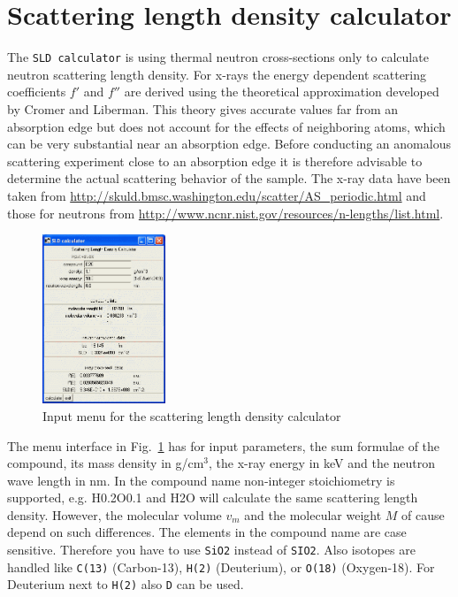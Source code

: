 \clearpage
\section{Scattering length density calculator}
\label{sec:SLDcalculator}

The \texttt{SLD calculator} is using thermal neutron cross-sections
only to calculate neutron scattering length density. For x-rays the
energy dependent scattering coefficients $f'$ and $f''$ are derived
using the theoretical approximation developed by Cromer and
Liberman. This theory gives accurate values far from an absorption
edge but does not account for the effects of neighboring atoms,
which can be very substantial near an absorption edge. Before
conducting an anomalous scattering experiment close to an absorption
edge it is therefore advisable to determine the actual scattering
behavior of the sample. The x-ray data have been taken from
\url{http://skuld.bmsc.washington.edu/scatter/AS_periodic.html} and
those for neutrons from
\url{http://www.ncnr.nist.gov/resources/n-lengths/list.html}.
\begin{figure}[htb]
\begin{center}
\includegraphics[width=0.329\textwidth,height=0.451\textwidth]{SLDcalculator.png}
\end{center}
\caption{Input menu for the scattering length density calculator}
\label{fig:SLDcalculator}
\end{figure}
The menu interface in Fig.\ \ref{fig:SLDcalculator} has for input
parameters, the sum formulae of the compound, its mass density in
g/cm$^3$, the x-ray energy in keV and the neutron wave length in nm.
In the compound name non-integer stoichiometry is supported, e.g.
H0.2O0.1 and H2O will calculate the same scattering length density.
However, the molecular volume $v_m$ and the molecular weight $M$ of
cause depend on such differences. The elements in the compound name
are case sensitive. Therefore you have to use \texttt{SiO2} instead
of \texttt{SIO2}. Also isotopes are handled like \texttt{C(13)}
(Carbon-13), \texttt{H(2)} (Deuterium), or \texttt{O(18)}
(Oxygen-18). For Deuterium next to \texttt{H(2)} also \texttt{D} can
be used.

